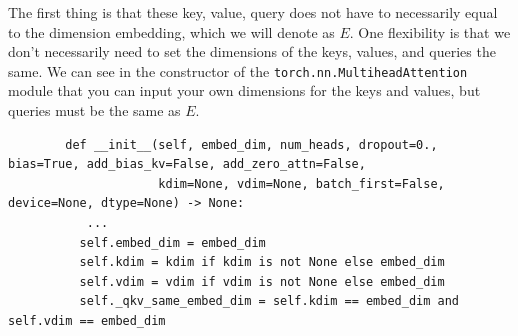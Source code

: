       The first thing is that these key, value, query does not have to necessarily equal to the dimension embedding, which we will denote as $E$. One flexibility is that we don't necessarily need to set the dimensions of the keys, values, and queries the same. We can see in the constructor of the \texttt{torch.nn.MultiheadAttention} module that you can input your own dimensions for the keys and values, but queries must be the same as $E$. 
      \begin{lstlisting}
        def __init__(self, embed_dim, num_heads, dropout=0., bias=True, add_bias_kv=False, add_zero_attn=False,
                     kdim=None, vdim=None, batch_first=False, device=None, dtype=None) -> None:
           ... 
          self.embed_dim = embed_dim
          self.kdim = kdim if kdim is not None else embed_dim
          self.vdim = vdim if vdim is not None else embed_dim
          self._qkv_same_embed_dim = self.kdim == embed_dim and self.vdim == embed_dim
      \end{lstlisting}

